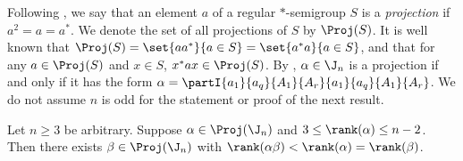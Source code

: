 Following \cite{NS1978}, we say that an element $a$ of a regular $*$-semigroup $S$ is a \emph{projection} if $a^2=a=a^*$.  We denote the set of all projections of $S$ by $\Proj(S)$.  It is well known that ${\Proj(S)=\set{aa^*}{a\in S}=\set{a^*a}{a\in S}}$, and that for any $a\in \Proj(S)$ and $x\in S$, $x^*ax\in \Proj(S)$.
%
By \cite[Lemma 4]{EF2012}, $\alpha\in\J_n$ is a projection if and only if it has the form $\alpha=\partI{a_1}{a_q}{A_1}{A_r}{a_1}{a_q}{A_1}{A_r}$.
%
We do not assume $n$ is odd for the statement or proof of the next result.




\begin{lemma}\label{lem:proj1_Jn}
Let $n\geq3$ be arbitrary.  Suppose $\alpha\in \Proj(\J_n)$ and $3\leq \rank(\alpha)\leq n-2$.  Then there exists $\beta\in \Proj(\J_n)$ with  $\rank(\alpha\beta)<\rank(\alpha)=\rank(\beta)$.
\end{lemma}

